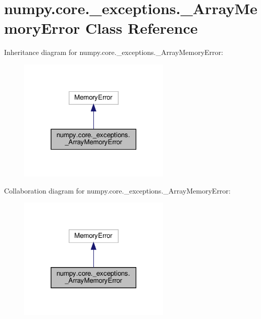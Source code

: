 \hypertarget{classnumpy_1_1core_1_1__exceptions_1_1__ArrayMemoryError}{}\section{numpy.\+core.\+\_\+exceptions.\+\_\+\+Array\+Memory\+Error Class Reference}
\label{classnumpy_1_1core_1_1__exceptions_1_1__ArrayMemoryError}


Inheritance diagram for numpy.\+core.\+\_\+exceptions.\+\_\+\+Array\+Memory\+Error\+:
\nopagebreak
\begin{figure}[H]
\begin{center}
\leavevmode
\includegraphics[width=206pt]{classnumpy_1_1core_1_1__exceptions_1_1__ArrayMemoryError__inherit__graph}
\end{center}
\end{figure}


Collaboration diagram for numpy.\+core.\+\_\+exceptions.\+\_\+\+Array\+Memory\+Error\+:
\nopagebreak
\begin{figure}[H]
\begin{center}
\leavevmode
\includegraphics[width=206pt]{classnumpy_1_1core_1_1__exceptions_1_1__ArrayMemoryError__coll__graph}
\end{center}
\end{figure}
